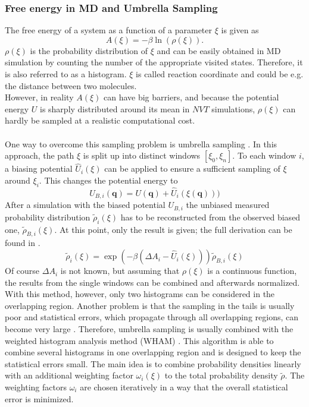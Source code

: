 \subsubsection{Free energy in MD and Umbrella Sampling}
The free energy of a system as a function of a parameter $\xi$ is given as
\begin{equation}
\label{eq:free_energy_from_rho}
A(\xi) = - \beta \ln\left(\rho(\xi)\right).
\end{equation}
$\rho(\xi)$ is the probability distribution of $\xi$ and can be easily obtained in MD simulation by counting the number of the appropriate visited states. Therefore, it is also referred to as a histogram. $\xi$ is called reaction coordinate and could be e.g. the distance between two molecules.\\
However, in reality $A(\xi)$ can have big barriers, and because the potential energy $U$ is sharply distributed around its mean in $NVT$ simulations, $\rho(\xi)$ can hardly be sampled at a realistic computational cost.\\
\\
One way to overcome this sampling problem is umbrella sampling \autocite{originalUmbrellaSampling}. In this approach, the path $\xi$ is split up into distinct windows $[\xi_0, \xi_n]$. To each window $i$, a biasing potential $\hat{U}_i(\xi)$ can be applied to ensure a sufficient sampling of $\xi$ around $\xi_i$. This changes the potential energy to
\begin{equation}
U_{B, i}(\mathbf{q}) = U(\mathbf{q}) + \hat{U}_i(\xi(\mathbf{q})))
\end{equation}
After a simulation with the biased potential $U_{B, i}$ the unbiased measured probability distribution $\tilde{\rho}_i(\xi)$ has to be reconstructed from the observed biased one, $\tilde{\rho}_{B, i}(\xi)$. At this point, only the result is given; the full derivation can be found in \textcite[p. 179ff]{UnderstandingMD}.\\
 \begin{equation}
 \label{eq:reconstruction_from_biased}
 \tilde{\rho}_{i}(\xi) = \exp\left(-\beta\left(\Delta A_i - \hat{U}_i(\xi)\right)\right)\tilde{\rho}_{B, i}(\xi)
 \end{equation}
Of course $\Delta A_i$ is not known, but assuming that $\rho(\xi)$ is a continuous function, the results from the single windows can be combined and afterwards normalized.\\
With this method, however, only two histograms can be considered in the overlapping region. Another problem is that the sampling in the tails is usually poor and statistical errors, which propagate through all overlapping regions, can become very large \autocite[236ff]{freeEnergyBook}. Therefore, umbrella sampling is usually combined with the weighted histogram analysis method (WHAM) \autocites{originalWHAM, extensionWHAM}. This algorithm is able to combine several histograms in one overlapping region and is designed to keep the statistical errors small. The main idea is to combine probability densities linearly with an additional weighting factor $\omega_i(\xi)$ to the total probability density $\tilde{\rho}$. The weighting factors $\omega_i$ are chosen iteratively in a way that the overall statistical error is minimized.\\